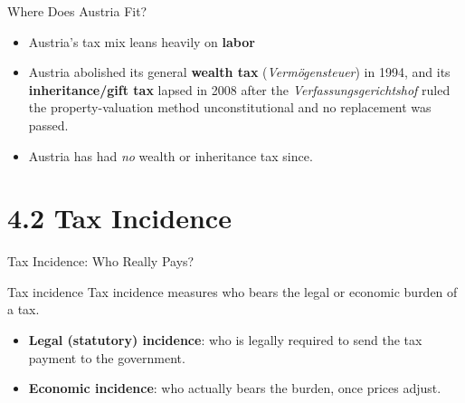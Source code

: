 \documentclass[11pt,aspectratio=169]{beamer}
\begin{document}
\begin{frame}{Where Does Austria Fit?}
  \begin{itemize}
    \item  Austria's tax mix leans heavily on \textbf{labor} 
    \item  Austria abolished its general \textbf{wealth tax} (\emph{Vermögensteuer}) in 1994, and its \textbf{inheritance/gift tax} lapsed in 2008 after the \emph{Verfassungsgerichtshof} ruled the property-valuation method unconstitutional and no replacement was passed. 
    \item Austria has had \emph{no} wealth or inheritance tax since.
  \end{itemize}
 
\end{frame}

\section{4.2 Tax Incidence}

\begin{frame}{Tax Incidence: Who Really Pays?}
  \begin{block}{Tax incidence}
   Tax incidence measures who bears the legal or economic burden of a tax.
  \end{block}
  \vspace{0.3em}
  \begin{itemize}
    \item \textbf{Legal (statutory) incidence}: who is legally required to send the tax payment to the government.
    \item \textbf{Economic incidence}: who actually bears the burden, once prices adjust.
  \end{itemize}
 

\end{frame}
\end{document}
